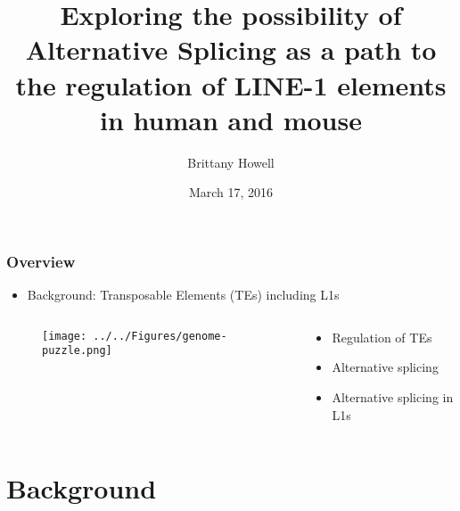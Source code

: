 \documentclass{beamer}
\title{Exploring the possibility of Alternative Splicing as a path to the regulation of LINE-1 elements in human and mouse}
\author{Brittany Howell}
\institute{Supervisors: Prof. Dave Adelson and Dr. Dan Kortschak}
\date{March 17, 2016}
\begin{document}
	
	\frame{\titlepage}

		\begin{frame} %
			
			\frametitle{Overview}
			
			\begin{itemize}
				\item Background: Transposable Elements (TEs) including L1s
			\end{itemize}
			\begin{columns}[c] %
				
				\begin{column}[T]{.6\textwidth}
					
					\begin{figure}
						\texttt{[image: ../../Figures/genome-puzzle.png]}
					\end{figure}
					
				\end{column}
			
			\begin{column}[T]{.55\textwidth}
				\begin{itemize}
					\item Regulation of TEs
					\item Alternative splicing
					\item Alternative splicing in L1s
				\end{itemize}
			\end{column}
			
				
			
			\end{columns}
				\end{frame}
			
			\section[Background]{Background}
			
\end{document}
